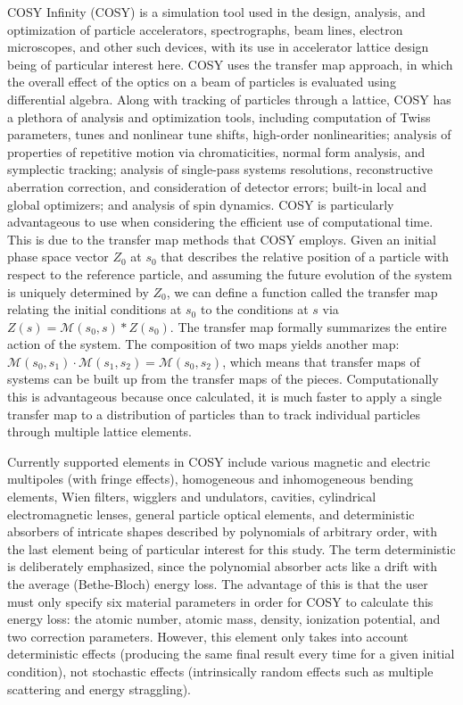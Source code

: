 \documentclass{jacow}
\begin{document}
COSY Infinity (COSY) \cite{COSY,Berz} is a simulation tool used in the design, analysis, and optimization of particle accelerators, spectrographs, beam lines, electron microscopes, and other such devices, with its use in accelerator lattice design being of particular interest here. COSY uses the transfer map approach, in which the overall effect of the optics on a beam of particles is evaluated using differential algebra. Along with tracking of particles through a lattice, COSY has a plethora of analysis and optimization tools, including computation of Twiss parameters, tunes and nonlinear tune shifts, high-order nonlinearities; analysis of properties of repetitive motion via chromaticities, normal form analysis, and symplectic tracking; analysis of single-pass systems resolutions, reconstructive aberration correction, and consideration of detector errors; built-in local and global optimizers; and analysis of spin dynamics.
COSY is particularly advantageous to use when considering the efficient use of computational time. This is due to the transfer map methods that COSY employs. Given an initial phase space vector $Z_0$ at $s_0$ that describes the relative position of a particle with respect to the reference particle, and assuming the future evolution of the system is uniquely determined by $Z_0$, we can define a function called the transfer map relating the initial conditions at $s_0$ to the conditions at $s$ via $Z(s)=\mathcal{M}(s_0,s)*Z(s_0)$. The transfer map formally summarizes the entire action of the system. The composition of two maps yields another map: $\mathcal{M}(s_0,s_1 )\cdot\mathcal{M}(s_1,s_2 )=\mathcal{M}(s_0,s_2)$, which means that transfer maps of systems can be built up from the transfer maps of the pieces. Computationally this is advantageous because once calculated, it is much faster to apply a single transfer map to a distribution of particles than to track individual particles through multiple lattice elements.

Currently supported elements in COSY include various magnetic and electric multipoles (with fringe effects), homogeneous and inhomogeneous bending elements, Wien filters, wigglers and undulators, cavities, cylindrical electromagnetic lenses, general particle optical elements, and deterministic absorbers of intricate shapes described by polynomials of arbitrary order, with the last element being of particular interest for this study. The term deterministic is deliberately emphasized, since the polynomial absorber acts like a drift with the average (Bethe-Bloch) energy loss. The advantage of this is that the user must only specify six material parameters in order for COSY to calculate this energy loss: the atomic number, atomic mass, density, ionization potential, and two correction parameters. However, this element only takes into account deterministic effects (producing the same final result every time for a given initial condition), not stochastic effects (intrinsically random effects such as multiple scattering and energy straggling).
\end{document}
